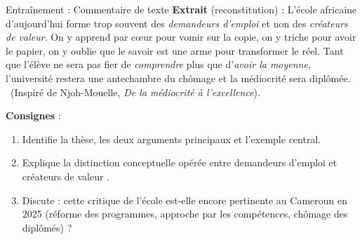 \documentclass[11pt]{article}
\begin{document}
\begin{exercice}{Entraînement : Commentaire de texte}
\textbf{Extrait} (reconstitution) : \guillemotleft L'école africaine d'aujourd'hui forme trop souvent des \emph{demandeurs d'emploi} et non des \emph{créateurs de valeur}. On y apprend par cœur pour vomir sur la copie, on y triche pour avoir le papier, on y oublie que le savoir est une arme pour transformer le réel. Tant que l'élève ne sera pas fier de \emph{comprendre} plus que d'\emph{avoir la moyenne}, l'université restera une antechambre du chômage et la médiocrité sera diplômée. \guillemotright\ (Inspiré de Njoh-Mouelle, \emph{De la médiocrité à l'excellence}).

\textbf{Consignes} : 
\begin{enumerate}
    \item Identifie la thèse, les deux arguments principaux et l'exemple central.
    \item Explique la distinction conceptuelle opérée entre \guillemotleft demandeurs d'emploi \guillemotright et \guillemotleft créateurs de valeur \guillemotright.
    \item Discute : cette critique de l'école est-elle encore pertinente au Cameroun en 2025 (réforme des programmes, approche par les compétences, chômage des diplômés) ?
\end{enumerate}
\end{exercice}
\end{document}
